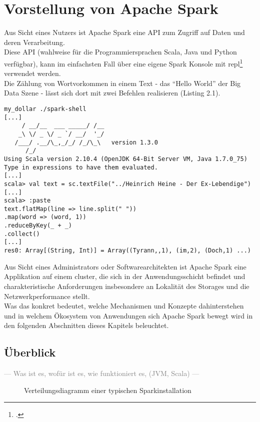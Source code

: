 \chapter{Vorstellung von Apache Spark}
Aus Sicht eines Nutzers ist Apache Spark eine API zum Zugriff auf Daten und deren Verarbeitung.\\

Diese API (wahlweise für die Programmiersprachen Scala, Java und Python verfügbar), kann im einfachsten Fall über eine eigene Spark Konsole mit \gls{repl}\footcite{Hail} verwendet werden.\\
Die Zählung von Wortvorkommen in einem Text - das "`Hello World"' der Big Data Szene - lässt sich dort mit zwei Befehlen realisieren (Listing 2.1).\\

\begin{lstlisting}[caption=Word Count in der Spark Konsole]
my_dollar ./spark-shell
[...]
     / __/__  ___ _____/ /__
    _\ \/ _ \/ _ `/ __/  '_/
   /___/ .__/\_,_/_/ /_/\_\   version 1.3.0
      /_/
Using Scala version 2.10.4 (OpenJDK 64-Bit Server VM, Java 1.7.0_75)
Type in expressions to have them evaluated.
[...]
scala> val text = sc.textFile("../Heinrich Heine - Der Ex-Lebendige")
[...]
scala> :paste
text.flatMap(line => line.split(" "))
.map(word => (word, 1))
.reduceByKey(_ + _)
.collect()
[...]
res0: Array[(String, Int)] = Array((Tyrann,,1), (im,2), (Doch,1) ...)

\end{lstlisting}


Aus Sicht eines Administrators oder Softwarearchitekten ist Apache Spark eine Applikation auf einem \gls{cluster}, die sich in der Anwendungsschicht befindet und charakteristische Anforderungen insbesondere an Lokalität des Storages und die Netzwerkperformance stellt.\\

Was das konkret bedeutet, welche Mechanismen und Konzepte dahinterstehen und in welchem Ökosystem von Anwendungen sich Apache Spark bewegt wird in den folgenden Abschnitten dieses Kapitels beleuchtet.

\section{Überblick}
\textcolor{gray}{--- Was ist es, wofür ist es, wie funktioniert es, (JVM, Scala) ---}

\begin{figure}[h]
	\centering
  
	\caption{Verteilungsdiagramm einer typischen Sparkinstallation}
	\label{figure:sparkdeployment}
\end{figure}


